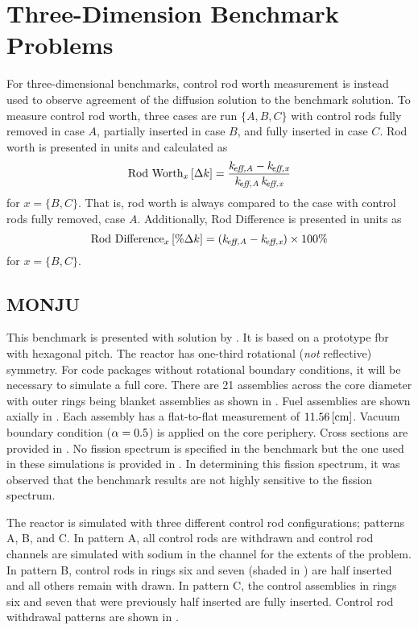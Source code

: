 \section{Three-Dimension Benchmark Problems}
  For three-dimensional benchmarks, control rod worth
  measurement is instead used to observe agreement of the diffusion solution 
  to the benchmark solution. To measure control rod worth, three cases are run
  $\{A,B,C\}$ with control rods fully removed in case $A$, partially inserted
  in case $B$, and fully inserted in case $C$. 
  Rod worth is presented in 
  units  and calculated as 
  \begin{equation}
    \text{Rod Worth}_x \left[\text{{$\Delta k$}}\right] = \frac{k_{\!\mbox{\scriptsize \em eff,{A}}} - k_{\!\mbox{\scriptsize \em eff,{x}}}}
      {k_{\!\mbox{\scriptsize \em eff,{A}}} \, k_{\!\mbox{\scriptsize \em eff,{x}}}}
  \end{equation}
  for $x = \{B,C\}$. That is, rod worth is always compared to the case with
  control rods fully removed, case $A$. Additionally, Rod Difference is
  presented in units  as
  \begin{equation}
    \text{Rod Difference}_x \left[\text{{$\% \Delta k$}}\right] = (k_{\!\mbox{\scriptsize \em eff,{A}}} - k_{\!\mbox{\scriptsize \em eff,{x}}}) 
      \times 100 \%
  \end{equation}
  for $x = \{B,C\}$.

  \subsection{MONJU}
    \label{sec:monju}
    This benchmark is presented with solution by \textcite{monjuBenchmark}.
    It is based on a prototype \gls{fbr} with hexagonal
    pitch. The reactor has one-third rotational (\textit{not} reflective)
    symmetry. For code packages without rotational boundary conditions, it will
    be necessary to simulate a full core. There are 21 assemblies across the
    core diameter with outer rings being blanket assemblies as shown in
    . Fuel assemblies are shown axially in
    . Each assembly has a flat-to-flat measurement of
    ${11.56 \left[\text{{cm}}\right]}$. Vacuum boundary condition ($\alpha = 0.5$) is applied
    on the core periphery. Cross sections are provided in . No
    fission spectrum is specified in the benchmark but the one used in these
    simulations is provided in . In determining this fission
    spectrum, it was observed that the benchmark results are not highly
    sensitive to the fission spectrum.

    The reactor is simulated with three different control rod configurations;
    patterns A, B, and C. In pattern A, all control rods are withdrawn and
    control rod channels are simulated with sodium in the channel for the
    extents of the problem. In pattern B, control rods in rings six and seven
    (shaded in ) are half inserted and all others remain
    with drawn. In pattern C, the control assemblies in rings six and seven that
    were previously half inserted are fully inserted. Control rod withdrawal
    patterns are shown in .
    
